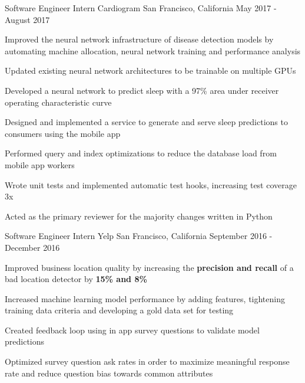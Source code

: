 


\begin{cventries}


\cventry
{Software Engineer Intern}
{Cardiogram}
{San Francisco, California}
{May 2017 - August 2017}
{ %
\begin{cvitems}
\item {Improved the neural network infrastructure of disease detection models by automating machine allocation, neural network training and performance analysis}
\item {Updated existing neural network architectures to be trainable on multiple GPUs}
\item {Developed a neural network to predict sleep with a 97\% area under receiver operating characteristic curve}
\item {Designed and implemented a service to generate and serve sleep predictions to consumers using the mobile app}
\item {Performed query and index optimizations to reduce the database load from mobile app workers}
\item {Wrote unit tests and implemented automatic test hooks, increasing test coverage 3x}
\item {Acted as the primary reviewer for the majority changes written in Python}
\end{cvitems}
}


\cventry
{Software Engineer Intern}
{Yelp}
{San Francisco, California}
{September 2016 - December 2016}
{ %
\begin{cvitems}
\item {Improved business location quality by increasing the \textbf{precision and recall} of a bad location detector by \textbf{15\% and 8\%}}
\item {Increased machine learning model performance by adding features, tightening training data criteria and developing a gold data set for testing}
\item {Created feedback loop using in app survey questions to validate model predictions}
\item {Optimized survey question ask rates in order to maximize meaningful response rate and reduce question bias towards common attributes}
\end{cvitems}
}


\end{cventries}
